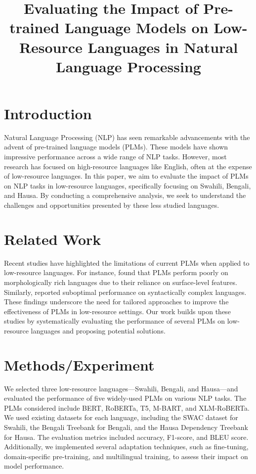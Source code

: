 \documentclass{article}
\title{Evaluating the Impact of Pre-trained Language Models on Low-Resource Languages in Natural Language Processing}
\author{}
\date{}
\begin{document}
\maketitle

\section{Introduction}
Natural Language Processing (NLP) has seen remarkable advancements with the advent of pre-trained language models (PLMs). These models have shown impressive performance across a wide range of NLP tasks. However, most research has focused on high-resource languages like English, often at the expense of low-resource languages. In this paper, we aim to evaluate the impact of PLMs on NLP tasks in low-resource languages, specifically focusing on Swahili, Bengali, and Hausa. By conducting a comprehensive analysis, we seek to understand the challenges and opportunities presented by these less studied languages.

\section{Related Work}
Recent studies have highlighted the limitations of current PLMs when applied to low-resource languages. For instance, \cite{DBLP:journals/corr/abs-2001-06703} found that PLMs perform poorly on morphologically rich languages due to their reliance on surface-level features. Similarly, \cite{DBLP:conf/acl/WuZCL20} reported suboptimal performance on syntactically complex languages. These findings underscore the need for tailored approaches to improve the effectiveness of PLMs in low-resource settings. Our work builds upon these studies by systematically evaluating the performance of several PLMs on low-resource languages and proposing potential solutions.

\section{Methods/Experiment}
We selected three low-resource languages—Swahili, Bengali, and Hausa—and evaluated the performance of five widely-used PLMs on various NLP tasks. The PLMs considered include BERT, RoBERTa, T5, M-BART, and XLM-RoBERTa. We used existing datasets for each language, including the SWAC dataset for Swahili, the Bengali Treebank for Bengali, and the Hausa Dependency Treebank for Hausa. The evaluation metrics included accuracy, F1-score, and BLEU score. Additionally, we implemented several adaptation techniques, such as fine-tuning, domain-specific pre-training, and multilingual training, to assess their impact on model performance.
\end{document}
